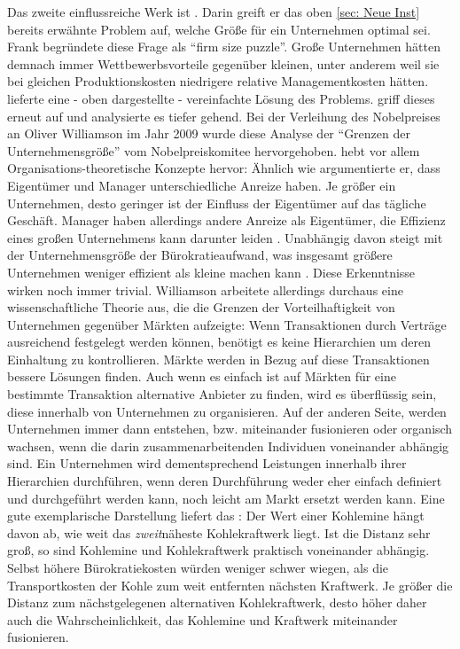  
Das zweite einflussreiche Werk ist \textcite{Williamson1985}. Darin greift er das oben \ref{sec: Neue Inst} bereits erwähnte Problem auf, welche Größe für ein Unternehmen optimal sei. Frank \textcite{Knight1921} begründete diese Frage als "`firm size puzzle"'. Große Unternehmen hätten demnach immer Wettbewerbsvorteile gegenüber kleinen, unter anderem weil sie bei gleichen Produktionskosten niedrigere relative Managementkosten hätten. \textcite{Coase1937} lieferte eine - oben dargestellte - vereinfachte Lösung des Problems. \textcite[S. 131ff]{Williamson1985} griff dieses erneut auf und analysierte es tiefer gehend. Bei der Verleihung des Nobelpreises an Oliver Williamson im Jahr 2009 wurde diese Analyse der "`Grenzen der Unternehmensgröße"' vom Nobelpreiskomitee hervorgehoben. \textcite{Williamson1985} hebt vor allem Organisations-theoretische Konzepte hervor: Ähnlich wie \textcite{Jensen1976} argumentierte er, dass Eigentümer und Manager unterschiedliche Anreize haben. Je größer ein Unternehmen, desto geringer ist der Einfluss der Eigentümer auf das tägliche Geschäft. Manager haben allerdings andere Anreize als Eigentümer, die Effizienz eines großen Unternehmens kann darunter leiden \parencite[S. 144ff]{Williamson1985}. Unabhängig davon steigt mit der Unternehmensgröße der Bürokratieaufwand, was insgesamt größere Unternehmen weniger effizient als kleine machen kann \parencite[S. 148ff]{Williamson1985}. Diese Erkenntnisse wirken noch immer trivial. Williamson arbeitete allerdings durchaus eine wissenschaftliche Theorie aus, die die Grenzen der Vorteilhaftigkeit von Unternehmen gegenüber Märkten aufzeigte: Wenn Transaktionen durch Verträge ausreichend festgelegt werden können, benötigt es keine Hierarchien um deren Einhaltung zu kontrollieren. Märkte werden in Bezug auf diese Transaktionen bessere Lösungen finden. Auch wenn es einfach ist auf Märkten für eine bestimmte Transaktion  alternative Anbieter zu finden, wird es überflüssig sein, diese innerhalb von Unternehmen zu organisieren. Auf der anderen Seite, werden Unternehmen immer dann entstehen, bzw. miteinander fusionieren oder organisch wachsen, wenn die darin zusammenarbeitenden Individuen voneinander abhängig sind. Ein Unternehmen wird dementsprechend Leistungen innerhalb ihrer Hierarchien durchführen, wenn deren Durchführung weder eher einfach definiert und durchgeführt werden kann, noch leicht am Markt ersetzt werden kann. Eine gute exemplarische Darstellung liefert das \textcite{Nobelopreiskomitee2009}: Der Wert einer Kohlemine hängt davon ab, wie weit das \textit{zweit}näheste Kohlekraftwerk liegt. Ist die Distanz sehr groß, so sind Kohlemine und Kohlekraftwerk praktisch voneinander abhängig. Selbst höhere Bürokratiekosten würden weniger schwer wiegen, als die Transportkosten der Kohle zum weit entfernten nächsten Kraftwerk. Je größer die Distanz zum nächstgelegenen alternativen Kohlekraftwerk, desto höher daher auch die Wahrscheinlichkeit, das Kohlemine und Kraftwerk miteinander fusionieren.
 
